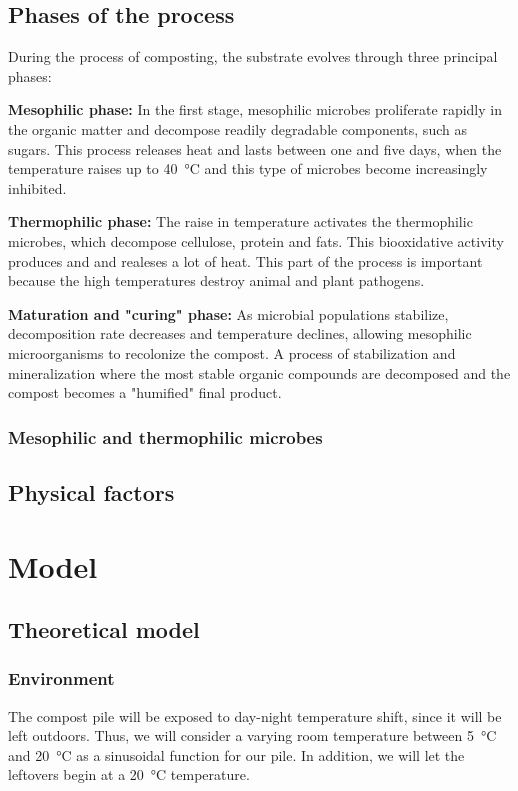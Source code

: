 \documentclass[12pt, a4paper, twocolumn]{article}
\numberwithin{table}{section}
\numberwithin{figure}{section}
\numberwithin{equation}{section}
\begin{document}
\subsection{Phases of the process}
During the process of composting, the substrate evolves through three principal phases:

\textbf{Mesophilic phase:} In the first stage, mesophilic microbes proliferate rapidly in the organic matter and decompose readily degradable components, such as sugars. This process releases heat and lasts between one and five days, when the temperature raises up to \SI{40}{\celsius} and this type of microbes become increasingly inhibited.

\textbf{Thermophilic phase:} The raise in temperature activates the thermophilic microbes, which decompose cellulose, protein and fats. This biooxidative activity produces  and  and realeses a lot of heat. This part of the process is important because the high temperatures destroy animal and plant pathogens.

\textbf{Maturation and "curing" phase:} As microbial populations stabilize, decomposition rate decreases and temperature declines, allowing mesophilic microorganisms to recolonize the compost. A process of stabilization and mineralization where the most stable organic compounds are decomposed and the compost becomes a "humified" final product.
 
\subsubsection{Mesophilic and thermophilic microbes}
\subsection{Physical factors}


\section{Model}

\subsection{Theoretical model}

\subsubsection{Environment}

The compost pile will be exposed to day-night temperature shift, since it will be left outdoors. Thus, we will consider a varying room temperature between \SI{5}{\celsius} and \SI{20}{\celsius} as a sinusoidal function for our pile. In addition, we will let the leftovers begin at a \SI{20}{\celsius} temperature.  
\end{document}
